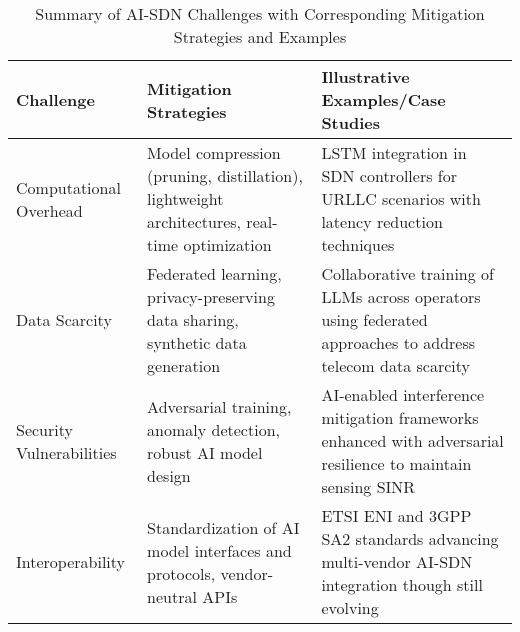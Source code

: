 \documentclass[sigconf]{acmart}
\begin{document}
\begin{table*}[htbp]
\centering
\caption{Summary of AI-SDN Challenges with Corresponding Mitigation Strategies and Examples}
\label{tab:challenge_mitigation}
\begin{adjustbox}{max width=\textwidth}
\begin{tabular}{@{}lll@{}}
\toprule
\textbf{Challenge} & \textbf{Mitigation Strategies} & \textbf{Illustrative Examples/Case Studies} \\ \midrule
Computational Overhead & Model compression (pruning, distillation), lightweight architectures, real-time optimization & LSTM integration in SDN controllers for URLLC scenarios with latency reduction techniques~\cite{ref52} \\
Data Scarcity & Federated learning, privacy-preserving data sharing, synthetic data generation & Collaborative training of LLMs across operators using federated approaches to address telecom data scarcity~\cite{ref7} \\
Security Vulnerabilities & Adversarial training, anomaly detection, robust AI model design & AI-enabled interference mitigation frameworks enhanced with adversarial resilience to maintain sensing SINR~\cite{ref48} \\
Interoperability & Standardization of AI model interfaces and protocols, vendor-neutral APIs & ETSI ENI and 3GPP SA2 standards advancing multi-vendor AI-SDN integration though still evolving~\cite{ref7} \\ \bottomrule
\end{tabular}
\end{adjustbox}
\end{table*}
\end{document}
